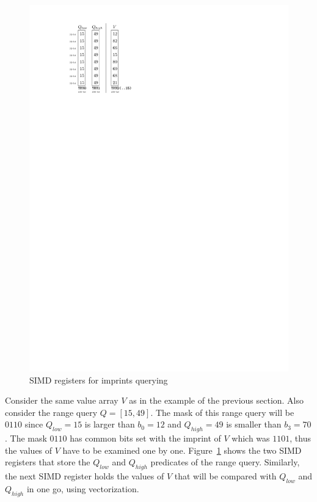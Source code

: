 \documentclass[sigconf]{acmart}
\begin{document}
\begin{figure}
\begin{center}
\includegraphics{query_ex.pdf}
\end{center}
\caption{SIMD registers for imprints querying\label{fig:query_ex}}
\end{figure}

Consider the same value array $V$ as in the example of the previous section. Also consider the range query $Q=[15,49]$. The
mask of this range query will be $0110$ since $Q_{low}=15$ is larger than $b_0=12$ and $Q_{high}=49$ is smaller than $b_3=70$.
The mask $0110$ has common bits set with the imprint of $V$ which was $1101$, thus the values of $V$ have to be examined one by one.
Figure~\ref{fig:query_ex} shows the two SIMD registers that store the $Q_{low}$ and $Q_{high}$ predicates of the range query.
Similarly, the next SIMD register holds the values of $V$ that will be compared with $Q_{low}$ and $Q_{high}$ in one go, using
vectorization.
\end{document}
